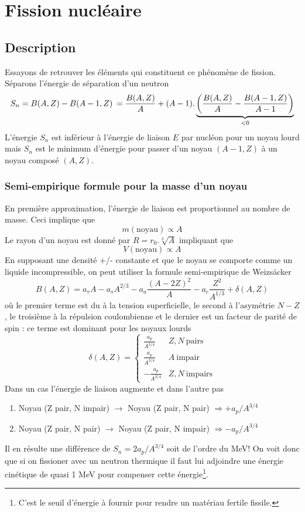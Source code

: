 \newpage
\section{Fission nucléaire}
\subsection{Description}
Essayons de retrouver les éléments qui constituent ce phénomène de fission. Séparons l'énergie de 
séparation d'un neutron
\begin{equation}
{S_n} = B(A,Z) - B(A - 1,Z)  {\kern 1pt} {\kern 1pt}  = \frac{{B(A,Z)}}{A} + (A - 1).
\underbrace{\left( {\frac{{B(A,Z)}}{A} - \frac{{B(A - 1,Z)}}{{A - 1}}} \right)}_{<0}
\end{equation}
L'énergie $S_n$ est inférieur à l'énergie de liaison $E$ par nucléon pour un noyau lourd mais 
$S_n$ est le minimum d'énergie pour passer d'un noyau $(A-1,Z)$ à un noyau composé $(A,Z)$.

\subsubsection{Semi-empirique formule pour la masse d'un noyau}
En première approximation, l'énergie de liaison est proportionnel au nombre de masse. Ceci implique 
que 
$$m(\text{noyau}) \propto A$$
Le rayon d'un noyau est donné par $R=r_0.\sqrt[3]{A}$ impliquant que
$$V(\text{noyau}) \propto A$$
En supposant une densité +/- constante et que le noyau se comporte comme un liquide incompressible, 
on peut utiliser la formule semi-empirique de Weizsäcker
\begin{equation}
B(A,Z) = {a_v}A - {a_s}{A^{2/3}} - {a_a}\frac{{{{(A - 2Z)}^2}}}{A} - {a_c}\frac{{{Z^2}}}{{{A^{1/3}}}} + \delta (A,Z)
\end{equation}
où le premier terme est du à la tension superficielle, le second à l'asymétrie $N-Z$, le troisième 
à la répulsion coulombienne et le dernier est un facteur de parité de spin : ce terme est dominant 
pour les noyaux lourds
\begin{equation}
\delta(A,Z) = \left\{\begin{array}{ll}
\frac{a_p}{A^{3/4}} & Z, N\ \text{pairs}\\
\frac{a_p}{A^{3/4}} & A\ \text{impair}\\
-\frac{a_p}{A^{3/4}} & Z, N\ \text{impairs}
\end{array}\right.
\end{equation}
Dans un cas l'énergie de liaison augmente et dans l'autre pas
\begin{enumerate}
\item Noyau (Z pair, N impair) $\to$ Noyau (Z pair, N pair) $\Rightarrow +a_p/A^{3/4}$
\item Noyau (Z pair, N pair) $\to$ Noyau (Z pair, N impair) $\Rightarrow -a_p/A^{3/4}$
\end{enumerate}
Il en résulte une différence de $S_n = 2a_p/A^{3/4}$ soit de l'ordre du MeV! On voit donc 
que si on fissioner avec un neutron thermique il faut lui adjoindre une énergie cinétique 
de quasi 1 MeV pour compenser cette énergie\footnote{C'est le seuil d'énergie à fournir 
pour rendre un matériau fertile fissile.}. 



